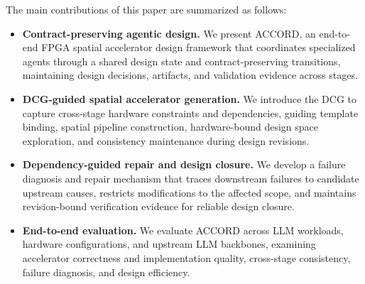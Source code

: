 The main contributions of this paper are summarized as follows:
\begin{itemize}
\item \textbf{Contract-preserving agentic design.}
We present ACCORD, an end-to-end FPGA spatial accelerator design framework that coordinates specialized agents through a shared design state and contract-preserving transitions, maintaining design decisions, artifacts, and validation evidence across stages.

\item \textbf{DCG-guided spatial accelerator generation.}
We introduce the DCG to capture cross-stage hardware constraints and dependencies, guiding template binding, spatial pipeline construction, hardware-bound design space exploration, and consistency maintenance during design revisions.

\item \textbf{Dependency-guided repair and design closure.}
We develop a failure diagnosis and repair mechanism that traces downstream failures to candidate upstream causes, restricts modifications to the affected scope, and maintains revision-bound verification evidence for reliable design closure.

\item \textbf{End-to-end evaluation.}
We evaluate ACCORD across LLM workloads, hardware configurations, and upstream LLM backbones, examining accelerator correctness and implementation quality, cross-stage consistency, failure diagnosis, and design efficiency.
\end{itemize}